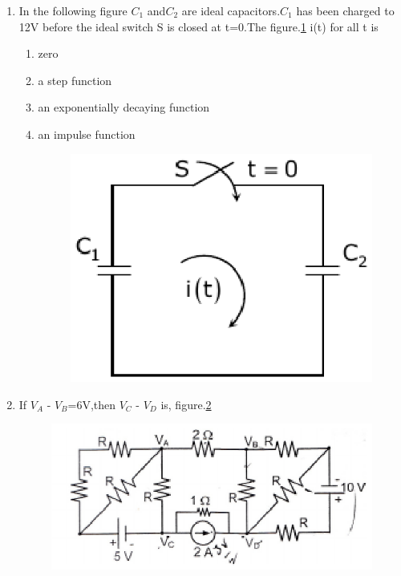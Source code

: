 \documentclass[journal,12pt,twocolumn]{IEEEtran}
\begin{document}
\begin{enumerate}
\item In the following figure $ C_{1} $ and$ C_{2} $ are ideal capacitors.$ C_{1} $ has been charged to 12V before the ideal switch S is closed at t=0.The figure.\ref{fig86} i(t) for all t is 
\begin{enumerate}
\setlength\itemsep{2em}
\item zero
\item a step function
\item an exponentially decaying function
\item an impulse function
\begin{figure}[!h]
\begin{center}
\includegraphics[scale=0.7]{./figs/fig86.eps}
\caption{}
\label{fig86}
\end{center}
\end{figure}
\end{enumerate}

\item If $ V_{A} $ - $ V_{B} $=6V,then $ V_{C} $ - $ V_{D} $ is, figure.\ref{fig87}
\begin{enumerate}
\begin{figure}[!h]
\begin{center}
\includegraphics[scale=0.9]{./figs/fig87.eps}
\caption{}
\label{fig87}
\end{center}
\end{figure}
\end{enumerate}


\end{enumerate}
\end{document}
